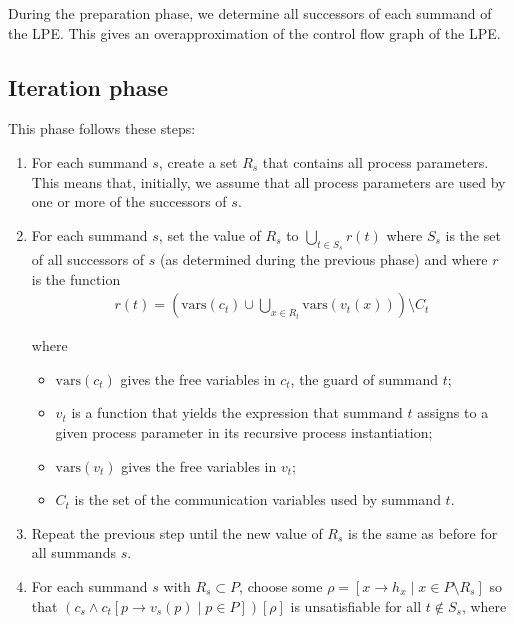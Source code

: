 During the preparation phase, we determine all successors of each summand of the LPE.
This gives an overapproximation of the control flow graph of the LPE.

\subsection{Iteration phase}

This phase follows these steps:

\begin{enumerate}

\item For each summand $s$, create a set $R_s$ that contains all process parameters.
This means that, initially, we assume that all process parameters are used by one or more of the successors of $s$.

\item For each summand $s$, set the value of $R_s$ to $\bigcup\limits_{t \in S_s}^{} r(t)$ where $S_s$ is the set of all successors of $s$ (as determined during the previous phase) and where $r$ is the function
\begin{align*}
r(t) = \left( \text{vars}(c_t) \cup \bigcup\limits_{x \in R_t}^{} \text{vars}(v_t(x)) \right) \setminus C_t
\end{align*}

where

\begin{itemize}
\item $\text{vars}(c_t)$ gives the free variables in $c_t$, the guard of summand $t$;
\item $v_t$ is a function that yields the expression that summand $t$ assigns to a given process parameter in its recursive process instantiation;
\item $\text{vars}(v_t)$ gives the free variables in $v_t$;
\item $C_t$ is the set of the communication variables used by summand $t$.
\end{itemize}

\item Repeat the previous step until the new value of $R_s$ is the same as before for all summands $s$.

\item For each summand $s$ with $R_s \subset P$, choose some $\rho = [x \rightarrow h_x \;|\; x \in P \setminus R_s]$ so that $({c_s} \land {c_t}[p \rightarrow v_s(p) \;|\; p \in P])[\rho]$ is unsatisfiable for all $t \notin S_s$, where


\end{enumerate}
